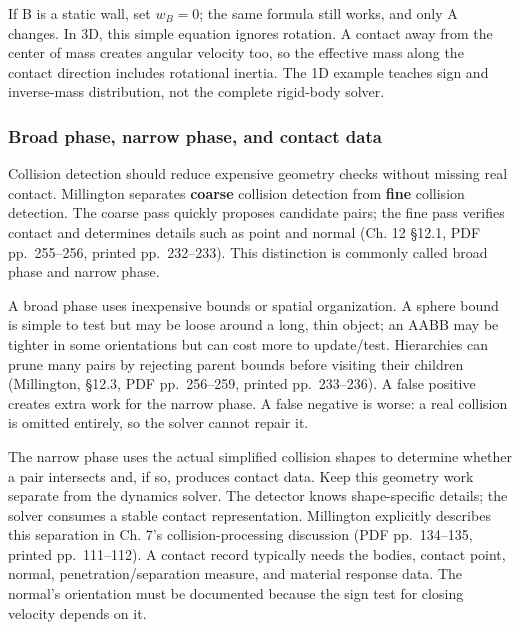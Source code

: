 If B is a static wall, set \(w_B=0\); the same formula still works, and only A changes. In 3D, this simple equation ignores rotation. A contact away from the center of mass creates angular velocity too, so the effective mass along the contact direction includes rotational inertia. The 1D example teaches sign and inverse-mass distribution, not the complete rigid-body solver.

\subsubsection{Broad phase, narrow phase, and contact data}\label{06-engine-ii-ch033-broad-phase-narrow-phase-and-contact-data}

\hypertarget{06-engine-ii-ch033-broad-phase-narrow-phase-and-contact-data}{}

Collision detection should reduce expensive geometry checks without missing real contact. Millington separates \textbf{coarse} collision detection from \textbf{fine} collision detection. The coarse pass quickly proposes candidate pairs; the fine pass verifies contact and determines details such as point and normal (Ch. 12 §12.1, PDF pp.~255--256, printed pp.~232--233). This distinction is commonly called broad phase and narrow phase.

A broad phase uses inexpensive bounds or spatial organization. A sphere bound is simple to test but may be loose around a long, thin object; an AABB may be tighter in some orientations but can cost more to update/test. Hierarchies can prune many pairs by rejecting parent bounds before visiting their children (Millington, §12.3, PDF pp.~256--259, printed pp.~233--236). A false positive creates extra work for the narrow phase. A false negative is worse: a real collision is omitted entirely, so the solver cannot repair it.

The narrow phase uses the actual simplified collision shapes to determine whether a pair intersects and, if so, produces contact data. Keep this geometry work separate from the dynamics solver. The detector knows shape-specific details; the solver consumes a stable contact representation. Millington explicitly describes this separation in Ch. 7's collision-processing discussion (PDF pp.~134--135, printed pp.~111--112). A contact record typically needs the bodies, contact point, normal, penetration/separation measure, and material response data. The normal's orientation must be documented because the sign test for closing velocity depends on it.

